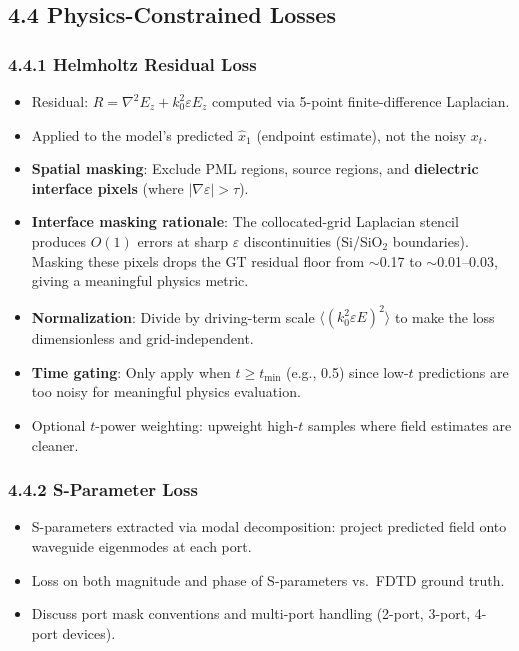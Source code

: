 \documentclass[11pt,letterpaper]{article}
\begin{document}
\subsection{4.4 Physics-Constrained Losses}

\subsubsection{4.4.1 Helmholtz Residual Loss}
\begin{itemize}
    \item Residual: $R = \nabla^2 E_z + k_0^2 \varepsilon E_z$ computed via 5-point finite-difference Laplacian.
    \item Applied to the model's predicted $\hat{x}_1$ (endpoint estimate), not the noisy $x_t$.
    \item \textbf{Spatial masking}: Exclude PML regions, source regions, and \textbf{dielectric interface pixels} (where $|\nabla\varepsilon| > \tau$).
    \item \textbf{Interface masking rationale}: The collocated-grid Laplacian stencil produces $O(1)$ errors at sharp $\varepsilon$ discontinuities (Si/SiO$_2$ boundaries). Masking these pixels drops the GT residual floor from $\sim$0.17 to $\sim$0.01--0.03, giving a meaningful physics metric.
    \item \textbf{Normalization}: Divide by driving-term scale $\langle(k_0^2 \varepsilon E)^2\rangle$ to make the loss dimensionless and grid-independent.
    \item \textbf{Time gating}: Only apply when $t \geq t_\text{min}$ (e.g., 0.5) since low-$t$ predictions are too noisy for meaningful physics evaluation.
    \item Optional $t$-power weighting: upweight high-$t$ samples where field estimates are cleaner.
\end{itemize}

\subsubsection{4.4.2 S-Parameter Loss}
\begin{itemize}
    \item S-parameters extracted via modal decomposition: project predicted field onto waveguide eigenmodes at each port.
    \item Loss on both magnitude and phase of S-parameters vs.\ FDTD ground truth.
    \item Discuss port mask conventions and multi-port handling (2-port, 3-port, 4-port devices).
\end{itemize}
\end{document}

